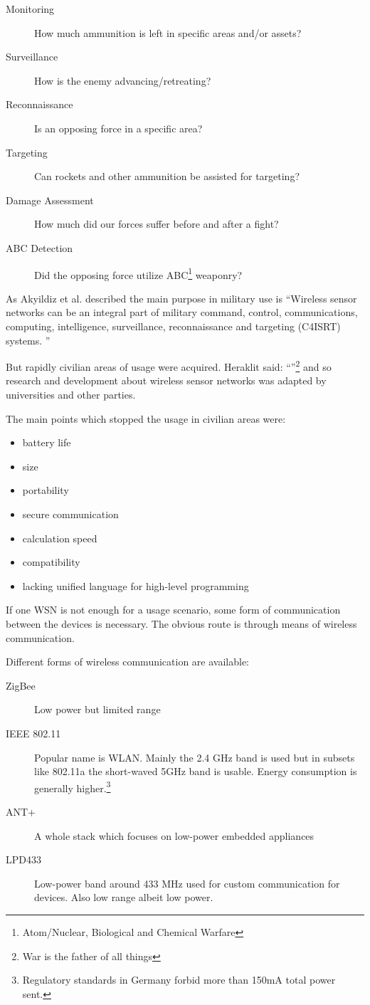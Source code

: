 \begin{description}
    \item[Monitoring] How much ammunition is left in specific areas and/or assets?
    \item[Surveillance] How is the enemy advancing/retreating?
    \item[Reconnaissance] Is an opposing force in a specific area?
    \item[Targeting] Can rockets and other ammunition be assisted for targeting?
    \item[Damage Assessment] How much did our forces suffer before and after a fight?
    \item[ABC Detection] Did the opposing force utilize ABC\footnote{Atom/Nuclear, Biological and Chemical Warfare} weaponry?
\end{description}

As Akyildiz et al. described the main purpose in military use is 
``Wireless sensor networks can be an integral part
of military command, control, communications,
computing, intelligence, surveillance, reconnaissance
and targeting (C4ISRT) systems.
''

But rapidly civilian areas of usage were acquired. Heraklit said: ``''\footnote{War is the father of all things} and so 
research and development about wireless sensor networks was adapted by universities and other parties.

The main points which stopped the usage in civilian areas were:

\begin{itemize}
\item battery life
\item size
\item portability
\item secure communication
\item calculation speed
\item compatibility
\item lacking unified language for high-level programming
\end{itemize}

If one \textsc{WSN} is not enough for a usage scenario, some form of communication between the devices is necessary. The obvious
route is through means of wireless communication.

Different forms of wireless communication are available:

\begin{description}
\item[ZigBee] Low power but limited range
\item[IEEE 802.11] Popular name is \textsc{WLAN}. Mainly the 2.4 GHz band is used but in subsets like 802.11a the short-waved 5GHz band is usable.
Energy consumption is generally higher.\footnote{Regulatory standards in Germany forbid more than 150mA total power sent.}
\item[ANT+] A whole stack which focuses on low-power embedded appliances
\item[LPD433] Low-power band around 433 MHz used for custom communication for devices. Also low range albeit low power.
\end{description}

